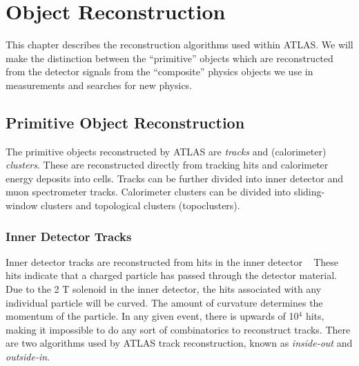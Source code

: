 

\chapter[Object Reconstruction][Top of Page Title]{Object Reconstruction}
\label{ch:reconstruction}

This chapter describes the reconstruction algorithms used within ATLAS.
We will make the distinction between the ``primitive'' objects which are reconstructed from the detector signals from the ``composite'' physics objects we use in measurements and searches for new physics.

\section{Primitive Object Reconstruction}

The primitive objects reconstructed by ATLAS are \textit{tracks} and (calorimeter) \textit{clusters}.
These are reconstructed directly from tracking hits and calorimeter energy deposits into cells.
Tracks can be further divided into inner detector and muon spectrometer tracks.
Calorimeter clusters can be divided into sliding-window clusters and topological clusters (topoclusters).
\subsection{Inner Detector Tracks}\label{sec:id_tracks}

Inner detector tracks are reconstructed from hits in the inner detector ~\cite{ATLAS-CONF-2012-042,ATL-PHYS-PUB-2015-051}
These hits indicate that a charged particle has passed through the detector material.
Due to the 2 T solenoid in the inner detector, the hits associated with any individual particle will be curved.
The amount of curvature determines the momentum of the particle.
In any given event, there is upwards of 10$^4$ hits, making it impossible to do any sort of combinatorics to reconstruct tracks.
There are two algorithms used by ATLAS track reconstruction, known as \textit{inside-out} and \textit{outside-in}.

